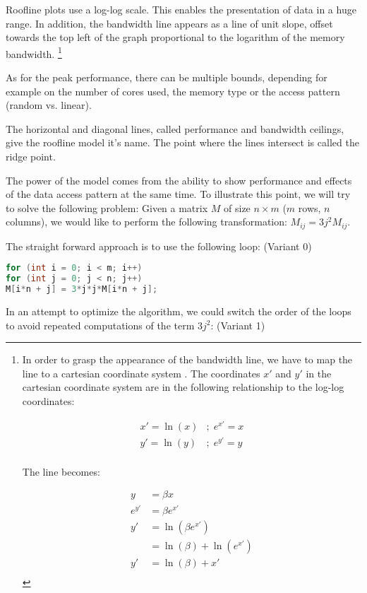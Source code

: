 \documentclass[a4paper,12pt]{article}
\begin{document}
Roofline plots use a log-log scale. This enables the presentation of data in a
huge range. In addition, the bandwidth line appears as a line of unit slope,
offset towards the top left of the graph proportional to the logarithm of the
memory bandwidth.
\footnote{ In order to grasp the appearance of the bandwidth line, we have to
map the line to a cartesian coordinate system .
The coordinates $x'$ and $y'$ in the cartesian coordinate system are in the
following relationship to the log-log coordinates:

\begin{align*}
x'=\ln(x)&;\; e^{x'}=x\\
y'=\ln(y)&;\; e^{y'}=y\\
\end{align*}

The line becomes:

\begin{align*}
y&=\beta x\\
e^{y'}&=\beta e^{x'}\\
y'&=\ln(\beta e^{x'})\\
&=\ln(\beta) + \ln(e^{x'})\\
y'&=\ln(\beta) + x'\\
\end{align*}
}

As for the peak performance, there can be multiple bounds, depending for example
on the number of cores used, the memory type or the access pattern (random vs.
linear).

The horizontal and diagonal lines, called performance and bandwidth ceilings,
give the roofline model it's name. The point where the lines intersect is called
the ridge point.

The power of the model comes from the ability to show performance and
effects of the data access pattern at the same time. To illustrate this point,
we will try to solve the following problem: Given a matrix $M$ of size
$n\times m$ ($m$ rows, $n$ columns), we would like to perform the following
transformation: $M_{ij}=3j^2M_{ij}$.

The straight forward approach is to use the following loop: (Variant 0)
\begin{lstlisting}[language=C] 
for (int i = 0; i < m; i++) 
for (int j = 0; j < n; j++)
M[i*n + j] = 3*j*j*M[i*n + j];
\end{lstlisting}

In an attempt to optimize the algorithm, we could switch the order of the loops
to avoid repeated computations of the term $3j^2$: (Variant 1)
\end{document}

